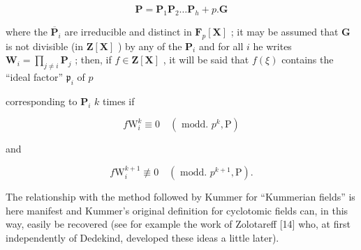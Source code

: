 \[
\mathbf {P} = \mathbf {P} _ {1} \mathbf {P} _ {2} \dots \mathbf {P} _ {h} + p. \mathbf {G}
\]

where the \(\overline{\mathbf{P}}_i\) are irreducible and distinct in \(\mathbf{F}_p[\mathbf{X}]\) ; it may be assumed that \(\mathbf{G}\) is not divisible (in \(\mathbf{Z}[\mathbf{X}]\) ) by any of the \(\mathbf{P}_i\) and for all \(i\) he writes \(\mathbf{W}_i = \prod_{j\neq i}\mathbf{P}_j\) ; then, if \(f\in \mathbf{Z}[\mathbf{X}]\) , it will be said that \(f(\xi)\) contains the ``ideal factor'' \(\mathfrak{p}_i\) of \(p\)

corresponding to \(\mathbf{P}_i\) \(k\) times if

\[
f \mathrm{W} _ {i} ^ {k} \equiv 0 \quad (\text { modd. } p ^ {k}, \mathrm{P})
\]

and

\[
f \mathrm{W} _ {i} ^ {k + 1} \not \equiv 0 \quad (\text { modd. } p ^ {k + 1}, \mathrm{P}).
\]

The relationship with the method followed by Kummer for ``Kummerian fields'' is here manifest and Kummer's original definition for cyclotomic fields can, in this way, easily be recovered (see for example the work of Zolotareff {[}14{]} who, at first independently of Dedekind, developed these ideas a little later).

